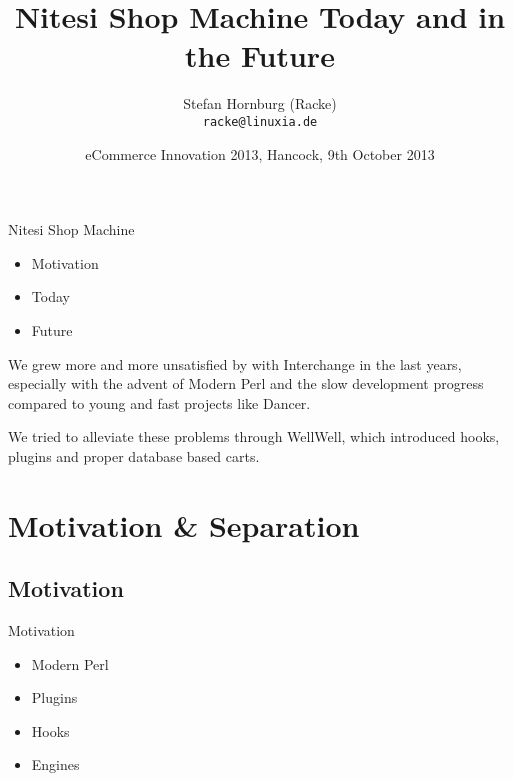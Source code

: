 \usepackage[utf8]{inputenc}
\usepackage[T1]{fontenc}
\usepackage{mathptmx}
\usepackage[scaled=.90]{helvet}
\usepackage{courier}
\usepackage{caption}
\captionsetup{labelformat=empty,labelsep=none}
\usepackage{beamerthemesplit}
\usepackage{verbatim}
\usepackage{hyperref}
\usepackage{listings}
\lstset{language=Perl,basicstyle=\normalsize,tabsize=3,showstringspaces=false}

\title{Nitesi Shop Machine Today and in the Future}
\author[racke]{Stefan Hornburg (Racke)\\ \texttt{racke@linuxia.de}}
\date{eCommerce Innovation 2013, Hancock, 9th October 2013}


\maketitle{}

\begin{frame}
  \titlepage
\end{frame}

\tableofcontents

\begin{frame}{Nitesi Shop Machine}
\begin{itemize}
\item Motivation
\item Today
\item Future
\end{itemize}
\end{frame}

We grew more and more unsatisfied by with Interchange in the last years,
especially with the advent of Modern Perl and the slow development progress
compared to young and fast projects like Dancer.

We tried to alleviate these problems through WellWell, which introduced
hooks, plugins and proper database based carts.

\section{Motivation \& Separation}

\subsection{Motivation}
\begin{frame}{Motivation}
\begin{itemize}
\item Modern Perl
\item Plugins
\item Hooks
\item Engines
\end{itemize}
\end{frame}

